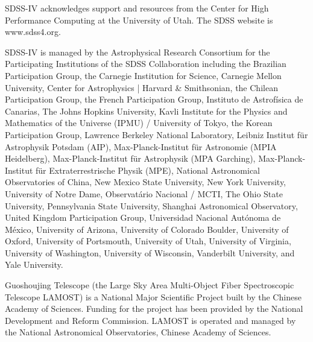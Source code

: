\documentclass[12pt, a4paper]{memoir}
\begin{document}
SDSS-IV acknowledges support and 
resources from the Center for High 
Performance Computing  at the 
University of Utah. The SDSS 
website is www.sdss4.org.

SDSS-IV is managed by the 
Astrophysical Research Consortium 
for the Participating Institutions 
of the SDSS Collaboration including 
the Brazilian Participation Group, 
the Carnegie Institution for Science, 
Carnegie Mellon University, Center for 
Astrophysics | Harvard \& 
Smithsonian, the Chilean Participation 
Group, the French Participation Group, 
Instituto de Astrof\'isica de 
Canarias, The Johns Hopkins 
University, Kavli Institute for the 
Physics and Mathematics of the 
Universe (IPMU) / University of 
Tokyo, the Korean Participation Group, 
Lawrence Berkeley National Laboratory, 
Leibniz Institut f\"ur Astrophysik 
Potsdam (AIP),  Max-Planck-Institut 
f\"ur Astronomie (MPIA Heidelberg), 
Max-Planck-Institut f\"ur 
Astrophysik (MPA Garching), 
Max-Planck-Institut f\"ur 
Extraterrestrische Physik (MPE), 
National Astronomical Observatories of 
China, New Mexico State University, 
New York University, University of 
Notre Dame, Observat\'ario 
Nacional / MCTI, The Ohio State 
University, Pennsylvania State 
University, Shanghai 
Astronomical Observatory, United 
Kingdom Participation Group, 
Universidad Nacional Aut\'onoma 
de M\'exico, University of Arizona, 
University of Colorado Boulder, 
University of Oxford, University of 
Portsmouth, University of Utah, 
University of Virginia, University 
of Washington, University of 
Wisconsin, Vanderbilt University, 
and Yale University.

Guoshoujing Telescope (the Large Sky Area Multi-Object Fiber Spectroscopic Telescope LAMOST) is a National Major Scientific Project built by the Chinese Academy of Sciences. Funding for the project has been provided by the National Development and Reform Commission. LAMOST is operated and managed by the National Astronomical Observatories, Chinese Academy of Sciences.
\end{document}

